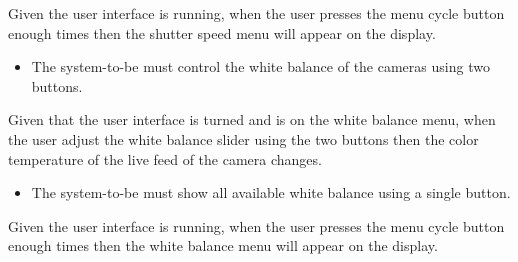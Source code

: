 Given the user interface is running, when the user presses the menu cycle button enough times then the shutter speed menu will appear on the display.
\begin{itemize}
	\item The system-to-be must control the white balance of the cameras using two buttons.
\end{itemize}
Given that the user interface is turned and is on the white balance menu, when the user adjust the white balance slider using the two buttons then the color temperature of the live feed of the camera changes.
\begin{itemize}
	\item The system-to-be must show all available white balance using a single button.
\end{itemize}
Given the user interface is running, when the user presses the menu cycle button enough times then the white balance menu will appear on the display.